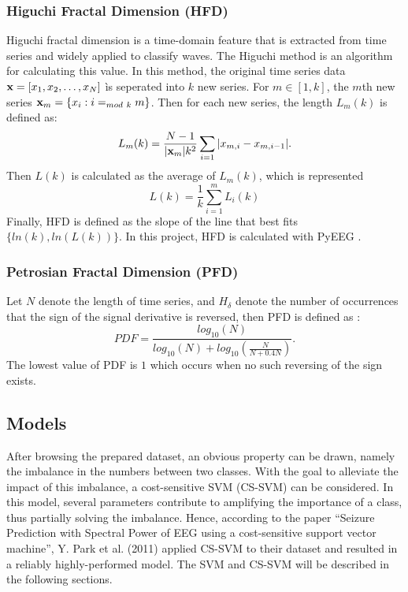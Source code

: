 \documentclass[10pt,twocolumn,letterpaper]{article}
\begin{document}
\subsubsection{Higuchi Fractal Dimension (HFD)}
Higuchi fractal dimension is a time-domain feature that is extracted from time series and widely applied to classify waves. The Higuchi method is an algorithm for calculating this value. In this method, the original time series data ${\bf x} = [x_1,x_2,\ldots,x_N]$ ìs seperated into $k$ new series. For $m\in[1,k]$, the $m$th new series ${\bf x}_m = \{x_i: i =_{mod\ k} m\}$. Then for each new series, the length $L_m(k)$ is defined as:
\begin{equation}
L_m(k) = \frac{N-1}{|{\bf x}_m|k^2}\sum_{i=1}|x_{m,i} - x_{m,i-1}|.
\end{equation}
Then $L(k)$ is calculated as the average of $L_m(k)$, which is represented
\begin{equation}
L(k) = \frac{1}{k}\sum^m_{i=1} L_i(k)
\end{equation}
Finally, HFD is defined as the slope of the line that best fits $\{ln(k),ln(L(k))\}$. In this project, HFD is calculated with PyEEG \cite{pyeeg}.

\subsubsection{Petrosian Fractal Dimension (PFD)}
Let $N$ denote the length of time series, and $H_\delta$ denote the number of occurrences that the sign of the signal derivative is reversed, then PFD is defined as \cite{pfd}:
\begin{equation}
PDF = \frac{log_{10}(N)}{log_{10}(N) + log_{10}(\frac{N}{N+0.4N})}.
\end{equation}
The lowest value of PDF is $1$ which occurs when no such reversing of the sign exists.

\subsection{Models}
After browsing the prepared dataset, an obvious property can be drawn, namely the imbalance in the numbers between two classes. With the goal to alleviate the impact of this imbalance, a cost-sensitive SVM (CS-SVM) can be considered. In this model, several parameters contribute to amplifying the importance of a class, thus partially solving the imbalance. Hence, according to the paper ``Seizure Prediction with Spectral Power of EEG using a cost-sensitive support vector machine'', Y. Park et al. (2011)\cite{cs-svm} applied CS-SVM to their dataset and resulted in a reliably highly-performed model. The SVM and CS-SVM will be described in the following sections.
\end{document}
